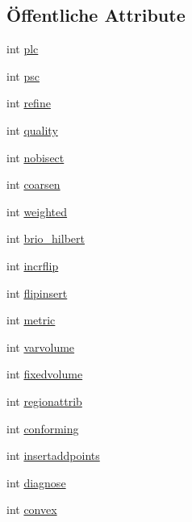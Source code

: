 \subsection*{Öffentliche Attribute}
\begin{DoxyCompactItemize}
\item 
int \hyperlink{classtetgenbehavior_a40797ab5b2da5eeb579c6bdfe18b15af}{plc}
\item 
int \hyperlink{classtetgenbehavior_aa0dcda160582fc2d2e39689961c47cfc}{psc}
\item 
int \hyperlink{classtetgenbehavior_a1db02f7b2524f86a79e5835bece8c6cd}{refine}
\item 
int \hyperlink{classtetgenbehavior_ac071721fb930cc08160743886b412889}{quality}
\item 
int \hyperlink{classtetgenbehavior_a14b1ffe9dae2e1849d22739d2ef3ba20}{nobisect}
\item 
int \hyperlink{classtetgenbehavior_a58032e83757a8447015fd99d7053db8c}{coarsen}
\item 
int \hyperlink{classtetgenbehavior_a6ad479e03a42fab8c5f6e4d6adb1be47}{weighted}
\item 
int \hyperlink{classtetgenbehavior_a26ae57c732cb3e74a94355c9a74c1612}{brio\-\_\-hilbert}
\item 
int \hyperlink{classtetgenbehavior_a340fcbca73520d6cbd33cc5ef113554d}{incrflip}
\item 
int \hyperlink{classtetgenbehavior_a42f3d0b7e5592ff2e920128bae4e442b}{flipinsert}
\item 
int \hyperlink{classtetgenbehavior_ad3c713eee4e296ce83387b778975a0ee}{metric}
\item 
int \hyperlink{classtetgenbehavior_a59fc93472c81cfe360ddb76c7e008d8e}{varvolume}
\item 
int \hyperlink{classtetgenbehavior_a42624c92f7ddb79c01775898ffedec33}{fixedvolume}
\item 
int \hyperlink{classtetgenbehavior_a9784f5c855b4aa50a0327ab1805f14f1}{regionattrib}
\item 
int \hyperlink{classtetgenbehavior_ac02fe16d48959b6ba9d85a1a3f5a0187}{conforming}
\item 
int \hyperlink{classtetgenbehavior_a663e7008fca88d61ff34f01716c98da8}{insertaddpoints}
\item 
int \hyperlink{classtetgenbehavior_a40cd0446f3d881658ed5754a3002c46e}{diagnose}
\item 
int \hyperlink{classtetgenbehavior_a691a8d3d667ed0709c7995248731c57d}{convex}
\item 

\end{DoxyCompactItemize}
